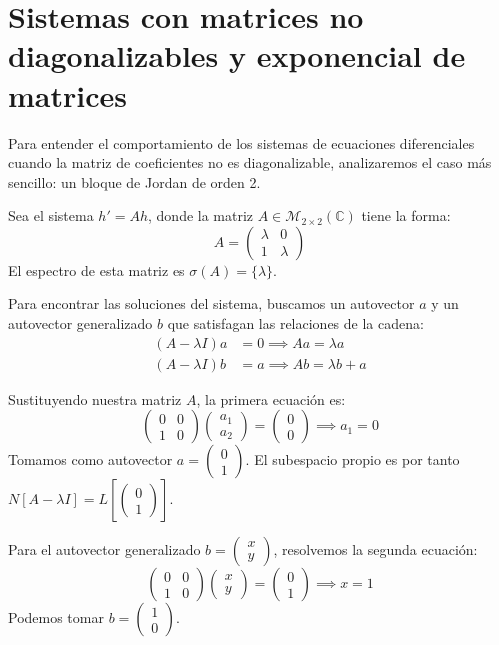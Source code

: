 ﻿\section{Sistemas con matrices no diagonalizables y exponencial de matrices}

Para entender el comportamiento de los sistemas de ecuaciones diferenciales cuando la matriz de coeficientes no es diagonalizable, analizaremos el caso más sencillo: un bloque de Jordan de orden 2.

Sea el sistema $h' = Ah$, donde la matriz $A \in \mathcal{M}_{2 \times 2}(\mathbb{C})$ tiene la forma:
\[
    A = \begin{pmatrix} \lambda & 0 \\ 1 & \lambda \end{pmatrix}
\]
El espectro de esta matriz es $\sigma(A) = \{\lambda\}$. 

Para encontrar las soluciones del sistema, buscamos un autovector $a$ y un autovector generalizado $b$ que satisfagan las relaciones de la cadena:
\begin{align*}
    (A - \lambda I)a &= 0 \implies Aa = \lambda a \\
    (A - \lambda I)b &= a \implies Ab = \lambda b + a
\end{align*}

Sustituyendo nuestra matriz $A$, la primera ecuación es:
\[
    \begin{pmatrix} 0 & 0 \\ 1 & 0 \end{pmatrix} \begin{pmatrix} a_1 \\ a_2 \end{pmatrix} = \begin{pmatrix} 0 \\ 0 \end{pmatrix} \implies a_1 = 0
\]
Tomamos como autovector $a = \begin{pmatrix} 0 \\ 1 \end{pmatrix}$. El subespacio propio es por tanto $N[A-\lambda I] = L\left[ \begin{pmatrix} 0 \\ 1 \end{pmatrix} \right]$.

Para el autovector generalizado $b = \begin{pmatrix} x \\ y \end{pmatrix}$, resolvemos la segunda ecuación:
\[
    \begin{pmatrix} 0 & 0 \\ 1 & 0 \end{pmatrix} \begin{pmatrix} x \\ y \end{pmatrix} = \begin{pmatrix} 0 \\ 1 \end{pmatrix} \implies x = 1
\]
Podemos tomar $b = \begin{pmatrix} 1 \\ 0 \end{pmatrix}$.

